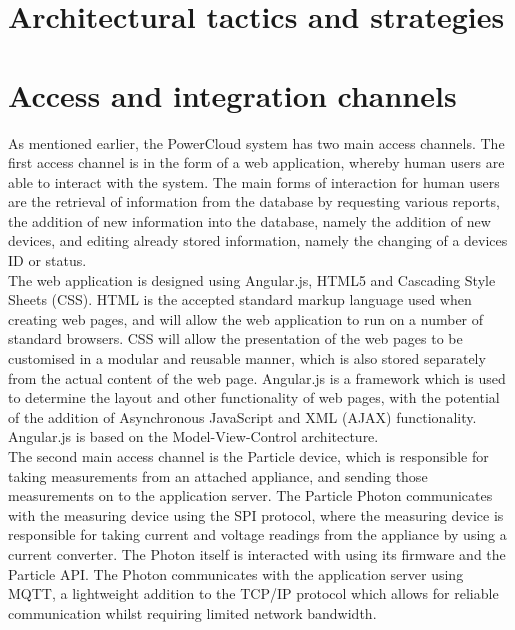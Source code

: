 \documentclass{article}
\begin{document}
\newpage

\section{Architectural tactics and strategies}

\newpage





\section{Access and integration channels}
	
	As mentioned earlier, the PowerCloud system has two main access channels. The first access channel is in the form of a web application, whereby human users are able to interact with the system. The main forms of interaction for human users are the retrieval of information from the database by requesting various reports, the addition of new information into the database, namely the addition of new devices, and editing already stored information, namely the changing of a devices ID or status.\\
	
	The web application is designed using Angular.js, HTML5 and Cascading Style Sheets (CSS). HTML is the accepted standard markup language used when creating web pages, and will allow the web application to run on a number of standard browsers. CSS will allow the presentation of the web pages to be customised in a modular and reusable manner, which is also stored separately from the actual content of the web page. Angular.js is a framework which is used to determine the layout and other functionality of web pages, with the potential of the addition of Asynchronous JavaScript and XML (AJAX) functionality. Angular.js is based on the Model-View-Control architecture.\\
	
	The second main access channel is the Particle device, which is responsible for taking measurements from an attached appliance, and sending those measurements on to the application server. The Particle Photon communicates with the measuring device using the SPI protocol, where the measuring device is responsible for taking current and voltage readings from the appliance by using a current converter. The Photon itself is interacted with using its firmware and the Particle API. The Photon communicates with the application server using MQTT, a lightweight addition to the TCP/IP protocol which allows for reliable communication whilst requiring limited network bandwidth.\\
	
\end{document}
